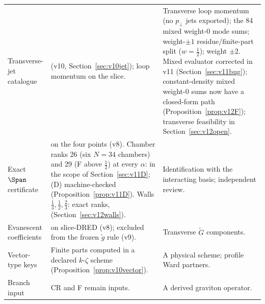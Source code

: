 \begin{longtable}{@{}L{.22\linewidth}L{.40\linewidth}L{.31\linewidth}@{}}
Transverse-jet catalogue &
\PARTIAL{} (v10, Section~\ref{sec:v10jet}); loop momentum on the
slice. &
Transverse loop momentum (no \(p_\perp\) jets exported); the 84 mixed
weight-0 mode sums; weight-\(\pm1\) residue/finite-part split
(\(w=\tfrac12\)); weight \(\pm2\). Mixed evaluator corrected in v11
(Section~\ref{sec:v11bug}); constant-density mixed weight-0 sums now have a
closed-form path (Proposition~\ref{prop:v12F}); transverse feasibility in
Section~\ref{sec:v12open}.\\

Exact \(\Span\) certificate &
\CPIR{} on the four points (v8). Chamber ranks 26 (six \(N=34\)
chambers) and 29 (F above \(\tfrac12\)) at every \(\alpha\):
\CPIR{} in the scope of Section~\ref{sec:v11D}; (D) machine-checked
(Proposition~\ref{prop:v11D}). Walls \(\tfrac13,\tfrac12,\tfrac23\): exact
ranks, \CPIR{} (Section~\ref{sec:v12walls}). &
Identification with the interacting basis; independent review.\\

Evanescent coefficients &
\CONDITIONAL{} on slice-DRED (v8); excluded from the frozen
\(\tilde g\) rule (v9). &
Transverse \(\tilde G\) components.\\

Vector-type keys &
Finite parts computed in a declared \(k\)-\(\zeta\) scheme
(Proposition~\ref{prop:v10vector}). &
A physical scheme; profile Ward partners.\\

Branch input &
CR and F remain inputs. &
A derived graviton operator.\\
\end{longtable}
\endgroup
